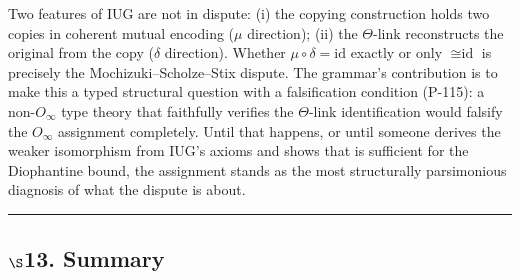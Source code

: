\documentclass[10pt,a4paper]{article}
\begin{document}
Two features of IUG are not in dispute:
(i) the copying construction holds two copies in coherent mutual encoding ($\mu$ direction);
(ii) the $\Theta$-link reconstructs the original from the copy ($\delta$ direction).
Whether $\mu \circ \delta = \text{id}$ exactly or only $\cong \text{id}$ is precisely
the Mochizuki--Scholze--Stix dispute.
The grammar's contribution is to make this a typed structural question
with a falsification condition (P-115):
a non-$O_{\infty}$ type theory that faithfully verifies the $\Theta$-link identification
would falsify the $O_{\infty}$ assignment completely.
Until that happens, or until someone derives the weaker isomorphism from IUG's axioms
and shows that is sufficient for the Diophantine bound, the assignment stands as
the most structurally parsimonious diagnosis of what the dispute is about.

\begin{center}
\rule{0.5\textwidth}{0.4pt}
\end{center}

\subsection{$\S$13. Summary}
\end{document}
